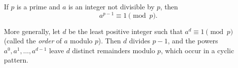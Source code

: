 If $p$ is a prime and $a$ is an integer not divisible by $p$, then
$$a^{p-1} \equiv 1 \pmod{p}.$$

More generally, let $d$ be the least positive integer such that $a^d \equiv 1 \pmod{p}$ (called the \textit{order} of $a$ modulo $p$). Then $d$ divides $p - 1$, and the powers $a^0, a^1, \ldots, a^{d-1}$ leave $d$ distinct remainders modulo $p$, which occur in a cyclic pattern.
